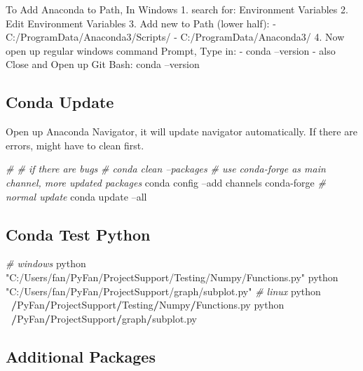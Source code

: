 \documentclass[
]{article}
\newenvironment{Shaded}{\begin{snugshade}}{\end{snugshade}}
\newcommand{\CommentTok}[1]{\textcolor[rgb]{0.56,0.35,0.01}{\textit{#1}}}
\newcommand{\ErrorTok}[1]{\textcolor[rgb]{0.64,0.00,0.00}{\textbf{#1}}}
\newcommand{\ExtensionTok}[1]{#1}
\newcommand{\NormalTok}[1]{#1}
\newcommand{\OperatorTok}[1]{\textcolor[rgb]{0.81,0.36,0.00}{\textbf{#1}}}
\newcommand{\StringTok}[1]{\textcolor[rgb]{0.31,0.60,0.02}{#1}}
\begin{document}
To Add Anaconda to Path, In Windows 1. search for: Environment Variables
2. Edit Environment Variables 3. Add new to Path (lower half): -
C:/ProgramData/Anaconda3/Scripts/ - C:/ProgramData/Anaconda3/ 4. Now
open up regular windows command Prompt, Type in: - conda --version -
also Close and Open up Git Bash: conda --version

\hypertarget{conda-update}{%
\subsection{Conda Update}\label{conda-update}}

Open up Anaconda Navigator, it will update navigator automatically. If
there are errors, might have to clean first.

\begin{Shaded}
\begin{Highlighting}[]
\CommentTok{# # if there are bugs}
\CommentTok{# conda clean --packages}
\CommentTok{# use conda-forge as main channel, more updated packages}
\ExtensionTok{conda}\NormalTok{ config --add channels conda-forge}
\CommentTok{# normal update}
\ExtensionTok{conda}\NormalTok{ update --all}
\end{Highlighting}
\end{Shaded}

\hypertarget{conda-test-python}{%
\subsection{Conda Test Python}\label{conda-test-python}}

\begin{Shaded}
\begin{Highlighting}[]
\CommentTok{# windows}
\NormalTok{python }\StringTok{"C:/Users/fan/PyFan/ProjectSupport/Testing/Numpy/Functions.py"}
\NormalTok{python }\StringTok{"C:/Users/fan/PyFan/ProjectSupport/graph/subplot.py"}
\CommentTok{# linux}
\NormalTok{python }\OperatorTok{~}\ErrorTok{/}\NormalTok{PyFan}\OperatorTok{/}\NormalTok{ProjectSupport}\OperatorTok{/}\NormalTok{Testing}\OperatorTok{/}\NormalTok{Numpy}\OperatorTok{/}\NormalTok{Functions.py}
\NormalTok{python }\OperatorTok{~}\ErrorTok{/}\NormalTok{PyFan}\OperatorTok{/}\NormalTok{ProjectSupport}\OperatorTok{/}\NormalTok{graph}\OperatorTok{/}\NormalTok{subplot.py}
\end{Highlighting}
\end{Shaded}

\hypertarget{additional-packages}{%
\subsection{Additional Packages}\label{additional-packages}}
\end{document}
